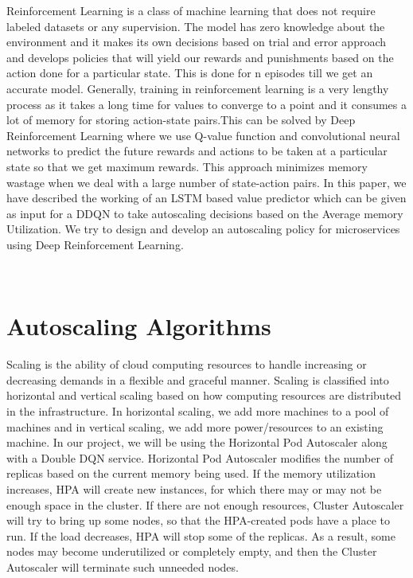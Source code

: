 \documentclass[conference]{IEEEtran}
\begin{document}
Reinforcement Learning is a class of machine learning that does not require labeled datasets or any supervision. The model has zero knowledge about the environment and it makes its own decisions based on trial and error approach and develops policies that will yield our rewards and punishments based on the action done for a particular state. This is done for n episodes till we get an accurate model. Generally, training in reinforcement learning is a very lengthy process as it takes a long time for values to converge to a point and it consumes a lot of memory for storing action-state pairs.This can be solved by Deep Reinforcement Learning where we use Q-value function and convolutional neural networks to predict the future rewards and actions to be taken at a particular state so that we get maximum rewards. This approach minimizes memory wastage when we deal with a large number of state-action pairs. In this paper, we have described the working of an LSTM based value predictor which can be given as input for a DDQN to take autoscaling decisions based on the Average memory Utilization. We try to design and develop an autoscaling policy for microservices using Deep Reinforcement Learning. 

\\

\section{Autoscaling Algorithms}

Scaling is the ability of cloud computing resources to handle increasing or decreasing demands in a flexible and graceful manner. Scaling is classified into horizontal and vertical scaling based on how computing resources are distributed in the infrastructure. In horizontal scaling, we add more machines to a pool of machines and in vertical scaling, we add more power/resources to an existing machine. In our project, we will be using the Horizontal Pod Autoscaler along with a Double DQN service. Horizontal Pod Autoscaler modifies the number of replicas based on the current memory being used. If the memory utilization increases, HPA will create new instances, for which there may or may not be enough space in the cluster. If there are not enough resources, Cluster Autoscaler will try to bring up some nodes, so that the HPA-created pods have a place to run. If the load decreases, HPA will stop some of the replicas. As a result, some nodes may become underutilized or completely empty, and then the Cluster Autoscaler will terminate such unneeded nodes.
\\
\end{document}
